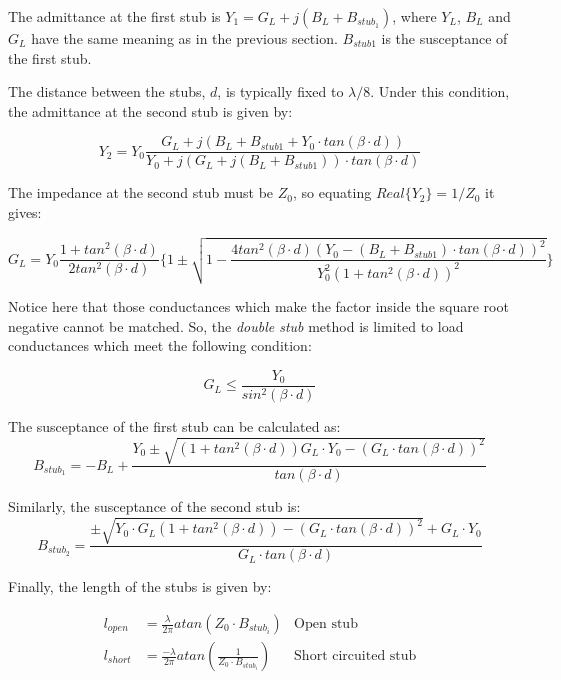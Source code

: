 The admittance at the first stub is $Y_1 = G_L + j(B_L + B_{stub_1})$, where $Y_L$, $B_L$ and $G_L$ have the same meaning as in the previous section. $B_{stub1}$ is the susceptance of the first stub.

The distance between the stubs, $d$, is typically fixed to $\lambda/8$. Under this condition, the admittance at the second stub is given by:

\begin{equation}
Y_2 = Y_0 \frac{G_L + j(B_L + B_{stub1} + Y_0 \cdot tan(\beta \cdot d))}{Y_0 + j (G_L + j(B_L + B_{stub1})) \cdot tan(\beta \cdot d)}
\end{equation}

\noindent The impedance at the second stub must be $Z_0$, so equating $Real\lbrace Y_2 \rbrace = 1/Z_0$ it gives:

\begin{equation}
G_L = Y_0\frac{1 + tan^2(\beta \cdot d)}{2tan^2(\beta \cdot d)} \lbrace 1 \pm \sqrt{1 - \frac{4tan^2(\beta \cdot d)(Y_0 - (B_L+B_{stub1})\cdot tan(\beta \cdot d))^2}{Y_0^2(1+tan^2(\beta \cdot d))^2}} \rbrace
\end{equation}

Notice here that those conductances which make the factor inside the square root negative cannot be matched. So, the \textit{double stub} method is limited to load conductances which meet the following condition:

\begin{equation}
G_L \leq \frac{Y_0}{sin^2(\beta \cdot d)}
\end{equation}

\noindent The susceptance of the first stub can be calculated as:
\begin{equation}
B_{stub_1} = - B_L + \frac{Y_0 \pm \sqrt{(1 + tan^2(\beta \cdot d))G_L\cdot Y_0 - (G_L \cdot tan(\beta \cdot d))^2}}{tan(\beta \cdot d)}
\end{equation}


\noindent Similarly, the susceptance of the second stub is:
\begin{equation}
B_{stub_2} = \frac{\pm\sqrt{Y_0\cdot G_L(1 + tan^2(\beta \cdot d)) - (G_L\cdot tan(\beta \cdot d))^2} + G_L \cdot Y_0}{G_L \cdot tan(\beta \cdot d)}
\end{equation}

\noindent Finally, the length of the stubs is given by:

\begin{align}
l_{open} & = \frac{\lambda}{2\pi} atan\left(Z_0\cdot B_{stub_i}\right)   & \text{Open stub}\\
l_{short} & = \frac{-\lambda}{2\pi} atan\left(\frac{1}{Z_0\cdot B_{stub_i}}\right) & \text{Short circuited stub}
\end{align}


